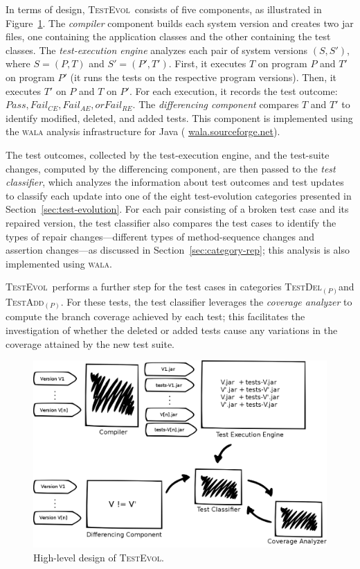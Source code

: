 \documentclass[conference]{IEEEtran}
\newcommand{\mt}{\mathit}
\newcommand{\pass}{\mt{Pass}}
\newcommand{\failce}{\mt{Fail}_{CE}}
\newcommand{\failre}{\mt{Fail}_{RE}}
\newcommand{\failae}{\mt{Fail}_{AE}}
\newcommand{\catdelp}{\textsc{TestDel}$_\mt{(P)}$}
\newcommand{\cataddp}{\textsc{TestAdd}$_\mt{(P)}$}
\newcommand{\tool}{\textsc{TestEvol}\xspace}
\begin{document}
In terms of design, \tool\ consists of five components, as illustrated
in Figure~\ref{fig:trex}.
%
The \emph{compiler} component builds each system version and creates
two jar files, one containing the application classes and the other
containing the test classes.
%
The \emph{test-execution engine} analyzes each pair of system versions
$(S, S')$, where $S = (P, T)$ and $S' = (P', T')$.  First, it executes
$T$ on program $P$ and $T'$ on program $P'$ (\ie it runs the tests on
the respective program versions).  Then, it executes $T'$ on $P$ and
$T$ on $P'$. For each execution, it records the test outcome: $\pass,
\failce, \failae, or \failre$.
%
The \emph{differencing component} compares $T$ and $T'$ to identify
modified, deleted, and added tests. This component is implemented
using the \textsc{wala} analysis infrastructure for Java ({\small
  \url{wala.sourceforge.net}}).

The test outcomes, collected by the test-execution engine, and the
test-suite changes, computed by the differencing component, are then
passed to the \emph{test classifier}, which analyzes the information
about test outcomes and test updates to classify each update into one
of the eight test-evolution categories presented in
Section~\ref{sec:test-evolution}. For each pair consisting of a broken
test case and its repaired version, the test classifier also compares
the test cases to identify the types of repair changes---different
types of method-sequence changes and assertion changes---as discussed
in Section~\ref{sec:category-rep}; this analysis is also implemented
using \textsc{wala}.

\tool\ performs a further step for the test cases in categories
\catdelp{}and \cataddp{}. For these tests, the test classifier
leverages the \emph{coverage analyzer} to compute the branch coverage
achieved by each test; this facilitates the investigation of whether
the deleted or added tests cause any variations in the coverage
attained by the new test suite.

\begin{figure}
	\centering
	\includegraphics[width=\columnwidth]{architecture}
        \vspace*{-20pt}
	\caption{High-level design of \tool.}
        \vspace*{-8pt}
	\label{fig:trex}
\end{figure}
\end{document}
